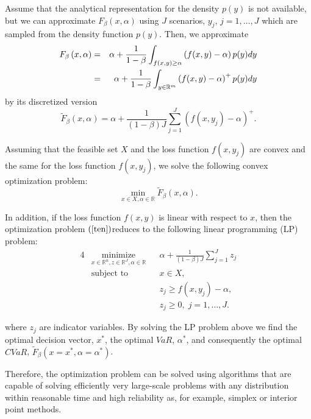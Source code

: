 \documentclass[a4paper,10pt]{article}
\begin{document}
Assume that the analytical representation for the density $p(y)$ is not available, but we can approximate $F_{\beta }\left( x,\alpha \right) $ using $J$ scenarios, $y_{j}$, $j=1,\ldots,J$ which are sampled from the density function $p(y)$. Then, we approximate
\begin{eqnarray}
F_{\beta }\left( x,\alpha \right) &=&\alpha +\frac{1}{1-\beta }%
\int_{f(x,y)\geq \alpha }\left( f(x,y)-\alpha \right) p(y)dy  \notag \\
&=&\alpha +\frac{1}{1-\beta }\int_{y\in	\mathbb{R}^{m}}\left( f(x,y)-\alpha \right)^{+}p(y)dy  \label{fb}
\end{eqnarray}%
by its discretized version
\begin{equation*}
\widetilde{F}_{\beta }\left( x,\alpha \right) =\alpha +\frac{1}{\left(
	1-\beta \right) J}\sum_{j=1}^{J}\left( f(x,y_{j})-\alpha \right) ^{+}.
\end{equation*}%

Assuming that the feasible set $X$ and the loss function $f(x,y_{j})$ are convex and the same for the loss function $f(x,y_{j})$, we solve the following convex optimization problem:
\begin{equation}
\underset{x\in X,\alpha \in	\mathbb{R}}{\min }\widetilde{F}_{\beta }\left( x,\alpha \right).  \label{ten}
\end{equation}

In addition, if the loss function $f(x,y)$ is linear with respect to \thinspace $x$, then the optimization problem $\left( \ref{ten}\right) $reduces to the following linear programming (LP) problem:
\begin{alignat}{4}
& \underset{x \in \mathbb{R}^{n},z\in 	\mathbb{R}^{J},\alpha \in \mathbb{R}}{\text{minimize}}
& & \alpha +\frac{1}{\left( 1-\beta \right)  J}\sum_{j=1}^{J}z_{j}
\\ 
& \text{subject to} 
& & x\in X,\\
&&& z_{j}\geq f(x,y_{j})-\alpha , \\
&&& z_{j}\geq 0, \; j = 1, \ldots, J.
\end{alignat}

where $z_{j}$ are indicator variables. By solving the LP problem above we find the optimal decision vector, $x^{\ast }$, the optimal $VaR$, $\alpha^{\ast }$, and consequently the optimal $CVaR$, $\widetilde{F}_{\beta}\left( x=x^{\ast },\alpha=\alpha ^{\ast }\right) $.

Therefore, the optimization problem can be solved using algorithms that are capable of solving efficiently very large-scale problems with any distribution within reasonable time and high reliability as, for example, simplex or interior point methods.
\end{document}
